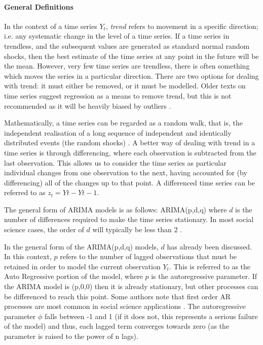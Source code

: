 \paragraph{General Definitions}

In the context of a time series $Y_t$, \textit{trend} refers to movement in a specific direction; i.e. any systematic change in the level of a time series. If a time series in trendless, and the subsequent values are generated as standard normal random shocks, then the best estimate of the time series at any point in the future will be the mean. However, very few time series are trendless, there is often something which moves the series in a particular direction. There are two options for dealing with trend: it must either be removed, or it must be modelled. Older texts on time series suggest regression as a means to remove trend, but this is not recommended as it will be heavily biased by outliers \cite{mccleary1980applied}.

Mathematically, a time series can be regarded as a random walk, that is, the independent realisation of a long sequence of independent and identically distributed events (the random shocks) \cite{venables2002modern}. A better way of dealing with trend in a time series is through differencing, where each observation is subtracted from the last observation. This allows us to consider the time series as particular individual changes from one observation to the next, having accounted for (by differencing) all of the changes up to that point. A differenced time series can be referred to as $z_t=Yt-Yt-1$.

The general form of ARIMA models is as follows: ARIMA(p,d,q) where $d$ is the number of differences required to make the time series stationary. In most social science cases, the order of $d$ will typically be less than 2 \cite{mccleary1980applied}.

In the general form of the ARIMA(p,d,q) models, $d$ has already been discussed. In this context, $p$ refers to the number of lagged observations that must be retained in order to model the current observation $Y_t$. This is referred to as the Auto Regressive portion of the model, where $p$ is the autoregressive parameter. If the ARIMA model is (p,0,0) then it is already stationary, but other processes can be differenced to reach this point. Some authors note that first order AR processes are most common in social science applications \cite{mccleary1980applied}. The autoregressive parameter $\phi$ falls between -1 and 1 (if it does not, this represents a serious failure of the model) and thus, each lagged term converges towards zero (as the parameter is raised to the power of n lags).


